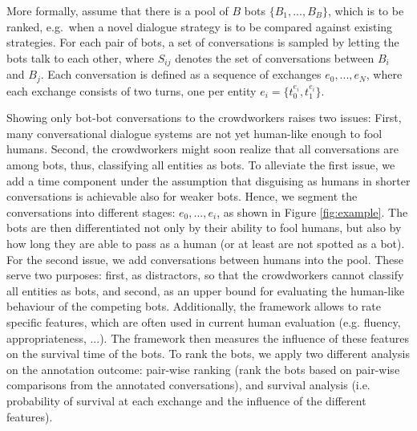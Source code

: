 \documentclass[11pt,a4paper]{article}
\begin{document}
More formally, assume that there is a pool of $B$ bots $\{B_1, ..., B_B\}$, which is to be ranked, e.g.\ when a novel dialogue strategy is to be compared against existing strategies. For each pair of bots, a set of conversations is sampled by letting the bots talk to each other, where $S_{ij}$ denotes the set of conversations between $B_i$ and $B_j$. Each conversation is defined as a sequence of exchanges $e_0, ..., e_N$, where each exchange consists of two turns, one per entity $e_i = \{t_0^{e_i}, t_1^{e_i}\}$.

Showing only bot-bot conversations to the crowdworkers raises two issues: First, many conversational dialogue systems are not yet human-like enough to fool humans. Second, the crowdworkers might soon realize that all conversations are among bots, thus, classifying all entities as bots. 
To alleviate the first issue, we add a time component under the assumption that disguising as humans in shorter conversations is achievable also for weaker bots. Hence, we segment the conversations into different stages: $e_0, ..., e_i$, as shown in Figure \ref{fig:example}. The bots are then differentiated not only by their ability to fool humans, but also by how long they are able to pass as a human (or at least are not spotted as a bot). For the second issue, we add conversations between humans into the pool. These serve two purposes: first, as distractors, so that the crowdworkers cannot classify all entities as bots, and second, as an upper bound for evaluating the human-like behaviour of the competing bots.
Additionally, the framework allows to rate specific features, which are often used in current human evaluation (e.g. fluency, appropriateness, ...). The framework then measures the influence of these features on the survival time of the bots. 
To rank the bots, we apply two different analysis on the annotation outcome: pair-wise ranking (rank the bots based on pair-wise comparisons from the annotated conversations), and survival analysis (i.e. probability of survival at each exchange and the influence of the different features).
\end{document}
